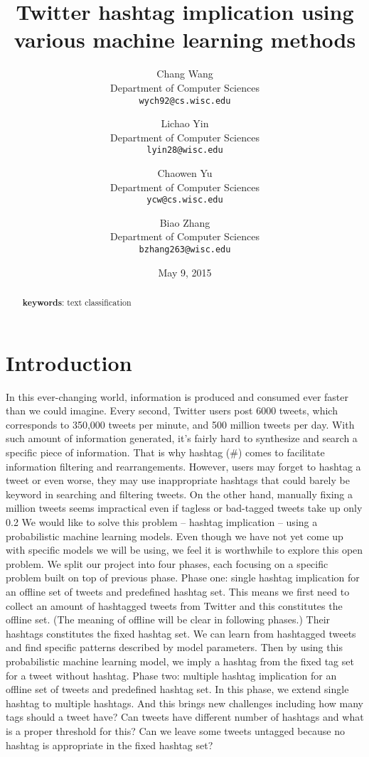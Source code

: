 \documentclass[letterpaper,11pt,twocolumn]{article}
\title{\bf{Twitter hashtag implication using various machine learning methods}}
\author{
  Chang Wang\\
  Department of Computer Sciences\\
  \texttt{wych92@cs.wisc.edu}
  \and
  Lichao Yin\\
  Department of Computer Sciences\\
  \texttt{lyin28@wisc.edu}
  \and
  Chaowen Yu\\
  Department of Computer Sciences\\
  \texttt{ycw@cs.wisc.edu}
  \and
  Biao Zhang\\
  Department of Computer Sciences\\
  \texttt{bzhang263@wisc.edu}
}
\date{May 9, 2015}
\begin{document}
\twocolumn[
\maketitle
]
\begin{abstract}
\textbf{keywords}: text classification
\end{abstract}


\section{Introduction}
\label{sec:intro}
In this ever-changing world, information is produced and consumed ever faster than we could imagine. Every second, Twitter users post 6000 tweets, which corresponds to 350,000 tweets per minute, and 500 million tweets per day. With such amount of information generated, it’s fairly hard to synthesize and search a specific piece of information. That is why hashtag (#) comes to facilitate information filtering and rearrangements. However, users may forget to hashtag a tweet or even worse, they may use inappropriate hashtags that could barely be keyword in searching and filtering tweets. On the other hand, manually fixing a million tweets seems impractical even if tagless or bad-tagged tweets take up only 0.2%
We would like to solve this problem – hashtag implication – using a probabilistic machine learning models. Even though we have not yet come up with specific models we will be using, we feel it is worthwhile to explore this open problem. We split our project into four phases, each focusing on a specific problem built on top of previous phase.
Phase one: single hashtag implication for an offline set of tweets and predefined hashtag set. This means we first need to collect an amount of hashtagged tweets from Twitter and this constitutes the offline set. (The meaning of offline will be clear in following phases.) Their hashtags constitutes the fixed hashtag set. We can learn from hashtagged tweets and find specific patterns described by model parameters. Then by using this probabilistic machine learning model, we imply a hashtag from the fixed tag set for a tweet without hashtag.
Phase two: multiple hashtag implication for an offline set of tweets and predefined hashtag set. In this phase, we extend single hashtag to multiple hashtags. And this brings new challenges including how many tags should a tweet have? Can tweets have different number of hashtags and what is a proper threshold for this? Can we leave some tweets untagged because no hashtag is appropriate in the fixed hashtag set?
\end{document}
